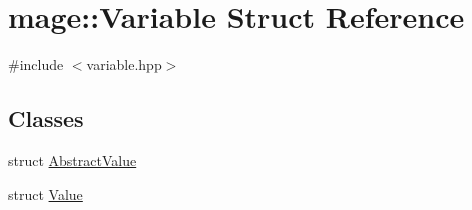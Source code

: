 \hypertarget{structmage_1_1_variable}{}\section{mage\+:\+:Variable Struct Reference}
\label{structmage_1_1_variable}


{\ttfamily \#include $<$variable.\+hpp$>$}

\subsection*{Classes}
\begin{DoxyCompactItemize}
\item 
struct \hyperlink{structmage_1_1_variable_1_1_abstract_value}{Abstract\+Value}
\item 
struct \hyperlink{structmage_1_1_variable_1_1_value}{Value}
\end{DoxyCompactItemize}
